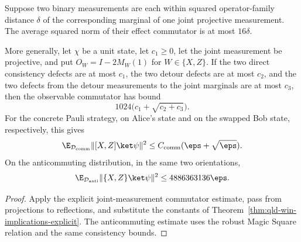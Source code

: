 \begin{theorem}
\label{thm:qld-point-observable-halves-explicit}
\leanok
{}
Suppose two binary measurements are each within squared operator-family
distance $\delta$ of the corresponding marginal of one joint projective
measurement.  The average squared norm of their effect commutator is at
most $16\delta$.

More generally, let $\chi$ be a unit state, let $c_1\geq0$, let the joint
measurement be projective, and put $O_W=I-2M_W(1)$ for $W\in\{X,Z\}$.
If the two direct consistency defects are at
most $c_1$, the two detour defects are at most $c_2$, and the two defects from
the detour measurements to the joint marginals are at most $c_3$, then the
observable commutator has bound
\[
  1024\bigl(c_1+\sqrt{c_2+c_3}\bigr).
\]
For the concrete Pauli strategy, on Alice's state and on the swapped Bob
state, respectively, this gives
\[
 \E_{\mathcal D_{\mathrm{comm}}}\|[X,Z]\ket\psi\|^2
 \leq C_{\mathrm{comm}}(\eps+\sqrt\eps).
\]
On the anticommuting distribution, in the same two orientations,
\[
 \E_{\mathcal D_{\mathrm{anti}}}\|\{X,Z\}\ket\psi\|^2
 \leq4886363136\eps.
\]
\end{theorem}
\begin{proof}
\leanok
Apply the explicit joint-measurement commutator estimate, pass from
projections to reflections, and substitute the constants of
Theorem~\ref{thm:qld-win-implications-explicit}.  The anticommuting estimate
uses the robust Magic Square relation and the same consistency bounds.
\end{proof}

